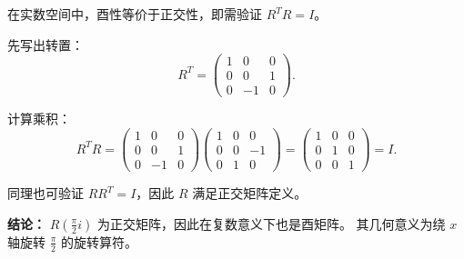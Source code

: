 \begin{solution}[旋转矩阵的正交性]

\answer
在实数空间中，酉性等价于正交性，即需验证 $R^T R=I$。

先写出转置：
\[
R^T=
\begin{pmatrix}
1&0&0\\
0&0&1\\
0&-1&0
\end{pmatrix}.
\]

计算乘积：
\[
R^T R=
\begin{pmatrix}
1&0&0\\
0&0&1\\
0&-1&0
\end{pmatrix}
\begin{pmatrix}
1&0&0\\
0&0&-1\\
0&1&0
\end{pmatrix}
=
\begin{pmatrix}
1&0&0\\
0&1&0\\
0&0&1
\end{pmatrix}
=I.
\]

同理也可验证 $RR^T=I$，因此 $R$ 满足正交矩阵定义。

\textbf{结论：}
$R\!\left(\frac{\pi}{2} i\right)$ 为正交矩阵，因此在复数意义下也是酉矩阵。
其几何意义为绕 $x$ 轴旋转 $\frac{\pi}{2}$ 的旋转算符。
\end{solution}


